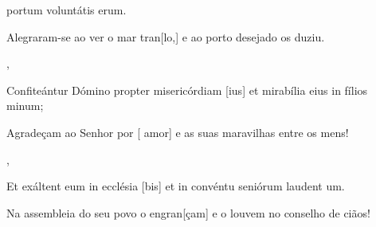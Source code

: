 {{      portum voluntátis erum.~\Responsorium}%
    {\item {}Alegraram-se ao ver o mar tran[lo,] e ao porto desejado os duziu.~\Responsorium},
  {\item {}Confiteántur Dómino propter misericórdiam [\-ius] et mirabília eius in fílios minum;~\Responsorium}%
    {\item {}Agradeçam ao Senhor por [ amor] e as suas maravilhas entre os mens!~\Responsorium},
  {\item {}Et exáltent eum in ecclésia [bis] et in convéntu seniórum laudent um.~\Responsorium}%
    {\item {}Na assembleia do seu povo o engran[çam] e o louvem no conselho de ciãos!~\Responsorium}
}